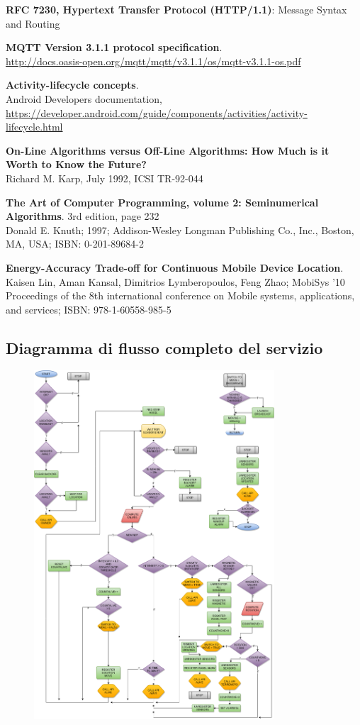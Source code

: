 \documentclass[a4paper,10pt]{memoir}
\begin{document}
\begin{thebibliography}{9}
	\textbf{RFC 7230, Hypertext Transfer Protocol (HTTP/1.1)}: Message Syntax and Routing

	\textbf{MQTT Version 3.1.1 protocol specification}. \\
	\url{http://docs.oasis-open.org/mqtt/mqtt/v3.1.1/os/mqtt-v3.1.1-os.pdf}

	\textbf{Activity-lifecycle concepts}. \\
	Android Developers documentation, \url{https://developer.android.com/guide/components/activities/activity-lifecycle.html}

	\textbf{On-Line Algorithms versus Off-Line Algorithms: How Much is it Worth to Know the Future?} \\
	Richard M. Karp, July 1992, ICSI TR-92-044

	\textbf{The Art of Computer Programming, volume 2: Seminumerical Algorithms}. 3rd edition, page 232 \\
	Donald E. Knuth; 1997; Addison-Wesley Longman Publishing Co., Inc., Boston, MA, USA; ISBN: 0-201-89684-2

	\textbf{Energy-Accuracy Trade-off for Continuous Mobile Device Location}. \\
	Kaisen Lin, Aman Kansal, Dimitrios Lymberopoulos, Feng Zhao; MobiSys '10 Proceedings of the 8th international conference on Mobile systems, applications, and services; ISBN: 978-1-60558-985-5

\end{thebibliography}

\begin{appendices}
\chapter{Diagramma di flusso completo del servizio}
\begin{figure}[ht]
\centering
\label{fig:serviceflowdiagram}
\includegraphics[width=0.8\textwidth]{SeismoCloud_flowdiag}
\end{figure}
\end{appendices}
\end{document}

